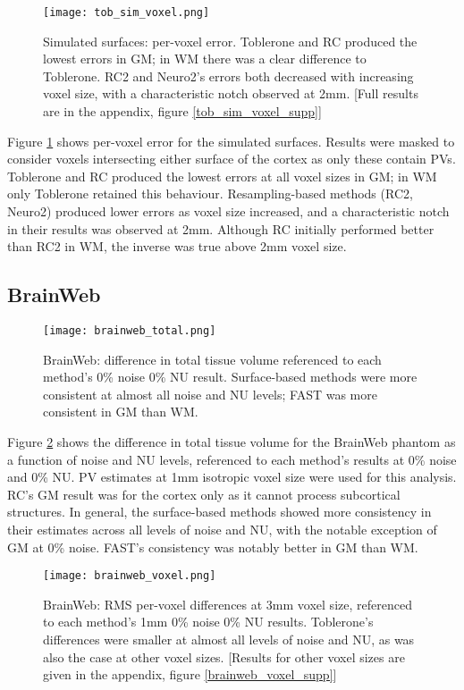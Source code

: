 \begin{figure}[H]
\centering
\texttt{[image: tob\_sim\_voxel.png]}
\caption{Simulated surfaces: per-voxel error. Toblerone and RC produced the lowest errors in GM; in WM there was a clear difference to Toblerone. RC2 and Neuro2’s errors both decreased with increasing voxel size, with a characteristic notch observed at 2mm. [Full results are in the appendix, figure \ref{tob_sim_voxel_supp}]}
\label{tob_sim_voxel}
\end{figure}

Figure \ref{tob_sim_voxel} shows per-voxel error for the simulated surfaces. Results were masked to consider voxels intersecting either surface of the cortex as only these contain PVs. Toblerone and RC produced the lowest errors at all voxel sizes in GM; in WM only Toblerone retained this behaviour. Resampling-based methods (RC2, Neuro2) produced lower errors as voxel size increased, and a characteristic notch in their results was observed at 2mm. Although RC initially performed better than RC2 in WM, the inverse was true above 2mm voxel size.

\subsection{BrainWeb}

\begin{figure}[H]
\centering
\texttt{[image: brainweb\_total.png]}
\caption{BrainWeb: difference in total tissue volume referenced to each method’s 0\% noise 0\% NU result. Surface-based methods were more consistent at almost all noise and NU levels; FAST was more consistent in GM than WM.}
\label{brainweb_total}
\end{figure}

Figure \ref{brainweb_total} shows the difference in total tissue volume for the BrainWeb phantom as a function of noise and NU levels, referenced to each method’s results at 0\% noise and 0\% NU. PV estimates at 1mm isotropic voxel size were used for this analysis. RC’s GM result was for the cortex only as it cannot process subcortical structures. In general, the surface-based methods showed more consistency in their estimates across all levels of noise and NU, with the notable exception of GM at 0\% noise. FAST’s consistency was notably better in GM than WM.

\begin{figure}[H]
\centering
\texttt{[image: brainweb\_voxel.png]}
\caption{BrainWeb: RMS per-voxel differences at 3mm voxel size, referenced to each method’s 1mm 0\% noise 0\% NU results. Toblerone’s differences were smaller at almost all levels of noise and NU, as was also the case at other voxel sizes. [Results for other voxel sizes are given in the appendix, figure \ref{brainweb_voxel_supp}]}
\label{brainweb_voxel}
\end{figure}

